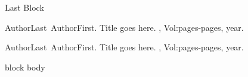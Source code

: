 \documentclass[t,12pt]{beamer}
\begin{document}
\begin{frame}
\begin{columns}[t]
\begin{column}{0.33\textwidth}
\begin{block}{Last Block}
		\begin{thebibliography}{[1]}
			AuthorLast~AuthorFirst.
			\newblock Title goes here.
			, Vol:pages-pages, year.
		
			AuthorLast~AuthorFirst.
			\newblock Title goes here.
			, Vol:pages-pages, year.
		\end{thebibliography}
		
		\begin{beamercolorbox}[wd=1ex,ht=\textheight]{block body}
		\end{beamercolorbox}
	\end{block}
\end{column}

\end{columns}\end{frame}
\end{document}
